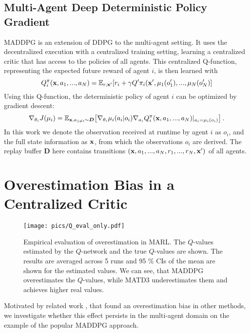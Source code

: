 \documentclass{article}
\renewcommand{\vec}[1]{\mathbf{\MakeLowercase{#1}}}
\newcommand{\set}[1]{\boldsymbol{#1}}
\newcommand{\detpol}{\mu}
\newcommand{\expectation}{\mathbb{E}}
\newcommand{\param}{\theta}
\newcommand{\reward}{r}
\newcommand{\action}{a}
\newcommand{\replayBuffer}{\set{D}}
\newcommand{\policySet}{\mathbf{\pi}}
\newcommand{\fullobservation}{\vec{x}}
\newcommand{\observation}{o}
\begin{document}
\subsection{Multi-Agent Deep Deterministic Policy Gradient}
\label{bg:maddpg}
\gls*{MADDPG} \cite{Lowe2017} is an extension of \gls*{DDPG} to the multi-agent setting. 
It uses the decentralized execution with a centralized training setting, learning a centralized critic that has access to the policies of all agents.
This centralized Q-function, representing the expected future reward of agent $i$, is then learned with
\begin{equation}
Q_i^\policySet (\fullobservation, \action_1,...,\action_N) = 
\expectation_{\reward, \fullobservation'}
[\reward_i + \gamma Q'^\policySet_i(\fullobservation',\detpol_1(\observation_1'),...,\detpol_N(\observation_N') ]
\label{eq:maddpg:qupdate}
\end{equation}
Using this Q-function, the deterministic policy of agent $i$ can be optimized by gradient descent:
\begin{equation}
\begin{split}
\nabla_{\param_i}J(\detpol_i) = \expectation_{\fullobservation,\action_{j\neq i}\sim\replayBuffer} \big[\nabla_{\param_i}\detpol_i(\action_i|\observation_i)
\nabla_{\action_i} 
Q_i^\policySet(\fullobservation,\action_1,...,\action_N)|_{{\action_i}=\detpol_i(\observation_i)}\big] \,.
\end{split}
\label{eq:maddpg:polgrad}
\end{equation}
In this work we denote the observation received at runtime by agent $i$ as $\observation_i$, and the full state information as $\fullobservation$, from which the observations $o_i$ are derived.
The replay buffer $\replayBuffer$ here contains transitions $(\fullobservation,\action_1,...,\action_N,\reward_1,...,\reward_N,\fullobservation')$ of all agents. 

\section{Overestimation Bias in a Centralized Critic}
\label{sec:overestimation}
\begin{wrapfigure}[18]{r}{0.5\textwidth}
	\texttt{[image: pics/Q\_eval\_only.pdf]}
	\centering
	\caption{Empirical evaluation of overestimation in MARL. The $Q$-values estimated by the $Q$-network and the true $Q$-values are shown. The results are averaged across 5 runs and 95 \% CIs of the mean are shown for the estimated values. We can see, that MADDPG overestimates the $Q$-values, while MATD3 underestimates them and achieves higher real values.}
	\label{fig:overestimation} 	
\end{wrapfigure}
Motivated by related work \cite{Fujimoto2018,VanHasselt2010,VanHasselt2015}, that found an overestimation bias in other methods, we investigate whether this effect persists in the multi-agent domain on the example of the popular \gls*{MADDPG} approach.
\end{document}
